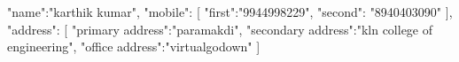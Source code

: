 {
"name":"karthik kumar",
"mobile": [
{"first":"9944998229",
"second": "8940403090"
}
],
"address": [
{
"primary address":"paramakdi",
"secondary address":"kln college of engineering",
"office address":"virtualgodown"
}
]

}